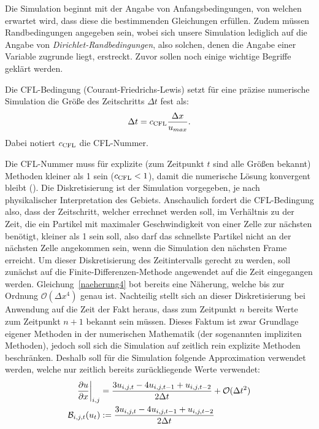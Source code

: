 Die Simulation beginnt mit der Angabe von Anfangsbedingungen, von welchen erwartet wird, dass diese die bestimmenden Gleichungen erfüllen. Zudem müssen Randbedingungen angegeben sein, wobei sich unsere Simulation lediglich auf die Angabe von \emph{Dirichlet-Randbedingungen}, also solchen, denen die Angabe einer Variable zugrunde liegt, erstreckt. Zuvor sollen noch einige wichtige Begriffe geklärt werden.
\begin{Definitionbox}[]
    Die CFL-Bedingung (Courant-Friedrichs-Lewis) setzt für eine präzise numerische Simulation die Größe des Zeitschritts $\Delta t$ fest als:
    \begin{align*}
        \Delta t = c_{\text{CFL}} \frac{\Delta x}{u_{max}}.
    \end{align*}
    Dabei notiert $c_{\text{CFL}}$ die CFL-Nummer.
\end{Definitionbox}
Die CFL-Nummer muss für explizite (zum Zeitpunkt $t$ sind alle Größen bekannt) Methoden kleiner als 1 sein ($c_{\text{CFL}} < 1$), damit die numerische Lösung konvergent bleibt (\cite[S. 65]{lecheler_computational_2022}). Die Diskretisierung ist der Simulation vorgegeben, je nach physikalischer Interpretation des Gebiets. Anschaulich fordert die CFL-Bedingung also, dass der Zeitschritt, welcher errechnet werden soll, im Verhältnis zu der Zeit, die ein Partikel mit maximaler Geschwindigkeit von einer Zelle zur nächsten benötigt, kleiner als 1 sein soll, also darf das schnellste Partikel nicht an der nächsten Zelle angekommen sein, wenn die Simulation den nächsten Frame erreicht.
Um dieser Diskretisierung des Zeitintervalls gerecht zu werden, soll zunächst auf die Finite-Differenzen-Methode angewendet auf die Zeit eingegangen werden. %
Gleichung~\ref{naeherung4} bot bereits eine Näherung, welche bis zur Ordnung $\mathcal{O}(\Delta x^4)$ genau ist. Nachteilig stellt sich an dieser Diskretisierung bei Anwendung auf die Zeit der Fakt heraus, dass zum Zeitpunkt $n$ bereits Werte zum Zeitpunkt $n+1$ bekannt sein müssen. Dieses Faktum ist zwar Grundlage eigener Methoden in der numerischen Mathematik (der sogenannten impliziten Methoden), jedoch soll sich die Simulation auf zeitlich rein explizite Methoden beschränken. Deshalb soll für die Simulation folgende Approximation verwendet werden, welche nur zeitlich bereits zurückliegende Werte verwendet:
\begin{align}
\label{eq:backward_time}
    \left.\frac{\partial u}{\partial x}\right\lvert_{i,j} &= \frac{3u_{i,j,t}-4u_{i,j,t-1}+u_{i,j,t-2}}{2\Delta t} + \mathcal{O}(\Delta t^2) \\
    \mathcal{B}_{i,j,t}(u_t) &:= \frac{3u_{i,j,t}-4u_{i,j,t-1}+u_{i,j,t-2}}{2\Delta t} \\
\end{align}

